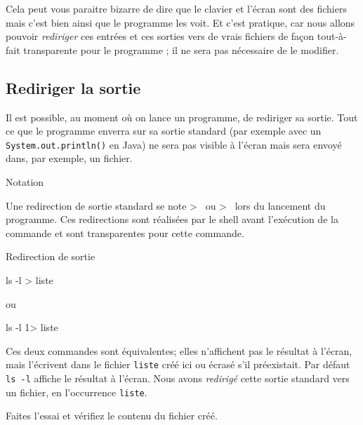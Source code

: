 \documentclass[a4paper,11pt]{article}
\begin{document}
	\medskip	
	
	Cela peut vous paraitre bizarre de dire que le clavier et l'\'ecran sont des
	fichiers mais c'est bien ainsi que le programme les voit. Et c'est pratique,
	car nous allons pouvoir \textit{rediriger} ces entr\'ees et ces sorties vers
	de vrais fichiers de fa\c con tout-\`a-fait transparente pour le programme
	; il ne sera pas n\'ecessaire de le modifier.
				


	\subsection{Rediriger la sortie}
		Il est possible, au moment o\`u on lance un programme, de rediriger sa sortie.
		Tout ce que le programme enverra sur sa sortie standard
		(par exemple avec un \verb_System.out.println()_ en Java) ne sera pas visible \`a l'\'ecran
		mais sera envoy\'e dans, par exemple, un fichier.
		\medskip	

		\begin{coltbox}{Notation}
		
			Une redirection de sortie standard se note \og > \fg\,  ou \og 1>
			\fg\, lors du lancement du programme.  Ces redirections sont
			r\'ealis\'ees par le shell avant l'ex\'ecution de la commande et
			sont transparentes pour cette commande.
		
		\end{coltbox}
					
		\begin{Exemple}{Redirection de sortie}
		        \begin{Console}
				ls -l > liste
		 	\end{Console}
			ou
			 \begin{Console}
				ls -l 1> liste
		 	\end{Console}
		\end{Exemple}
		
		Ces deux commandes sont \'equivalentes; elles n'affichent pas le r\'esultat \`a l'\'ecran,
		mais l'\'ecrivent dans le fichier \verb_liste_ cr\'e\'e ici ou \'ecras\'e s'il pr\'eexistait.
		Par d\'efaut \verb_ls -l_  affiche le r\'esultat \`a l'\'ecran. Nous avons \textit{redirig\'e} 
		cette sortie standard vers un fichier, en l'occurrence \verb_liste_.
				
            \par
        		\begin{steps}
			\item Faites l'essai et v\'erifiez le contenu du fichier cr\'e\'e.
		\end{steps}
				
\end{document}
